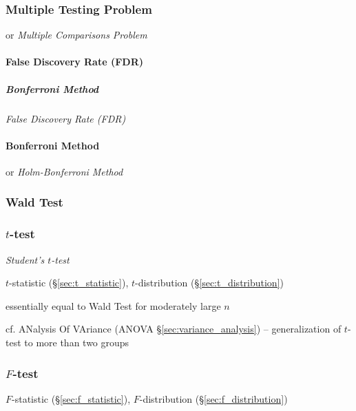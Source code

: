 \subsubsection{Multiple Testing Problem}\label{sec:multiple_testing}

or \emph{Multiple Comparisons Problem}




\paragraph{False Discovery Rate (FDR)}\label{sec:fdr}\hfill

\subparagraph{Bonferroni Method}\label{sec:bonferroni_method}\hfill

\emph{False Discovery Rate (FDR)}



\paragraph{Bonferroni Method}\label{sec:bonferroni_method}\hfill

or \emph{Holm-Bonferroni Method}



\subsubsection{Wald Test}\label{sec:wald_test}

\subsubsection{$t$-test}\label{sec:t_test}

\emph{Student's $t$-test}

\fist $t$-statistic (\S\ref{sec:t_statistic}),
$t$-distribution (\S\ref{sec:t_distribution})

essentially equal to Wald Test for moderately large $n$

\fist cf. ANalysis Of VAriance (ANOVA \S\ref{sec:variance_analysis}) --
generalization of $t$-test to more than two groups



\subsubsection{$F$-test}\label{sec:f_test}

\fist $F$-statistic (\S\ref{sec:f_statistic}),
$F$-distribution (\S\ref{sec:f_distribution})


